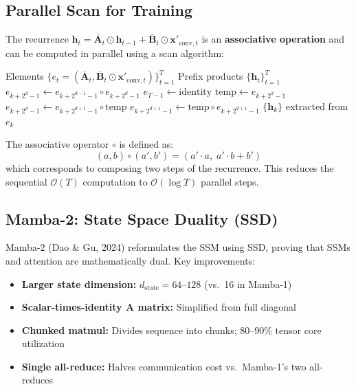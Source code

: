 \documentclass[11pt,a4paper]{article}
\begin{document}
\subsection{Parallel Scan for Training}

The recurrence $\mathbf{h}_t = \overline{\mathbf{A}}_t \odot \mathbf{h}_{t-1} + \overline{\mathbf{B}}_t \odot \mathbf{x}'_{\text{conv},t}$
is an \textbf{associative operation} and can be computed in parallel using a
scan algorithm:

\begin{algorithm}[h]
\caption{Parallel associative scan (Blelloch, 1990)}
\begin{algorithmic}[1]
\REQUIRE Elements $\{e_t = (\overline{\mathbf{A}}_t, \overline{\mathbf{B}}_t \odot \mathbf{x}'_{\text{conv},t})\}_{t=1}^T$
\ENSURE Prefix products $\{\mathbf{h}_t\}_{t=1}^T$
\STATE {}
    \STATE $e_{k+2^d-1} \gets e_{k+2^{d-1}-1} \circ e_{k+2^d-1}$
  \ENDFOR
\ENDFOR
\STATE {}
\STATE $e_{T-1} \gets \text{identity}$ 
    \STATE $\text{temp} \gets e_{k+2^d-1}$
    \STATE $e_{k+2^d-1} \gets e_{k+2^{d+1}-1} \circ \text{temp}$
    \STATE $e_{k+2^{d+1}-1} \gets \text{temp} \circ e_{k+2^{d+1}-1}$
  \ENDFOR
\ENDFOR
\STATE \RETURN $\{\mathbf{h}_k\}$ extracted from $e_k$
\end{algorithmic}
\end{algorithm}

The associative operator $\circ$ is defined as:
\[
(a, b) \circ (a', b') = (a' \cdot a,\; a' \cdot b + b')
\]
which corresponds to composing two steps of the recurrence. This reduces the
sequential $\mathcal{O}(T)$ computation to $\mathcal{O}(\log T)$ parallel steps.

\subsection{Mamba-2: State Space Duality (SSD)}

Mamba-2 (Dao \& Gu, 2024) reformulates the SSM using SSD, proving that SSMs
and attention are mathematically dual. Key improvements:

\begin{itemize}
  \item \textbf{Larger state dimension:} $d_{\text{state}} = 64$--$128$ (vs.\ 16 in Mamba-1)
  \item \textbf{Scalar-times-identity A matrix:} Simplified from full diagonal
  \item \textbf{Chunked matmul:} Divides sequence into chunks; 80--90\% tensor core utilization
  \item \textbf{Single all-reduce:} Halves communication cost vs.\ Mamba-1's two all-reduces
\end{itemize}
\end{document}
